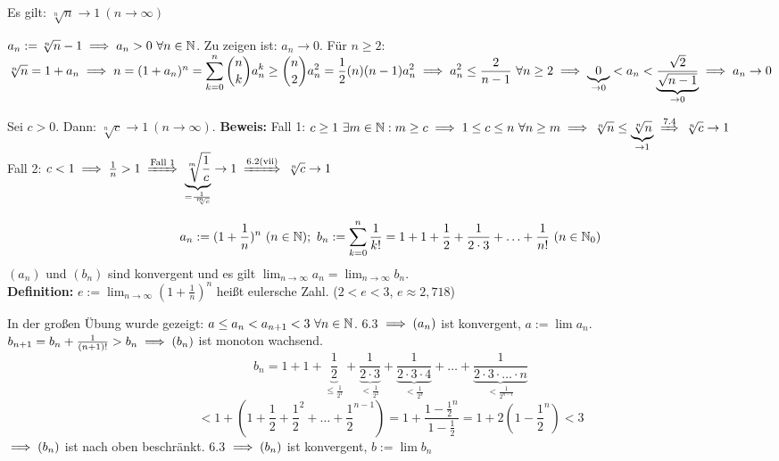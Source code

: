 \documentclass{article}
\begin{document}
\begin{satz}
Es gilt: $\sqrt[n]{n} \to 1 \ (n \to \infty)$
\end{satz}

\begin{beweis}
$a_n := \sqrt[n]{n} -1 \folgt a_n > 0 \ \forall n \in\MdN$. Zu zeigen ist: $a_n \to 0$. Für $n \ge 2$: $\sqrt[n]{n} = 1 + a_n \implies n = (1+a_n)^n = \displaystyle\sum_{k=0}^n \binom{n}{k}a_n^k \ge \binom{n}{2}a_n^2 = \frac{1}{2}(n)(n-1)a_n^2 \implies a_n^2 \le \frac{2}{n-1} \ \forall n\ge 2 \implies \underbrace{0}_{\to 0} < a_n < \underbrace{\frac{\sqrt{2}}{\sqrt{n-1}}}_{\to 0} \implies a_n \to 0$
\end{beweis}

\begin{wichtigesbeispiel}
Sei $c>0$. Dann: $\sqrt[n]{c} \to 1 \ (n\to\infty)$.
\textbf{Beweis:} Fall 1: $c\ge 1 \ \exists m \in\MdN: m \ge c \folgt 1\le c\le n \ \forall n\ge m \folgt \sqrt[n]{n} \le \underbrace{\sqrt[n]{n}}_{\to 1} \folgtnach{7.4} \sqrt[n]{c} \to 1$ \\
Fall 2: $c<1 \folgt \frac{1}{n} > 1 \folgtnach{Fall 1} \underbrace{\sqrt[m]{\frac{1}{c}}}_{=\frac{1}{\sqrt[m]{c}}} \to 1 \folgtnach{6.2(vii)} \sqrt[n]{c} \to 1$
\end{wichtigesbeispiel}

\begin{satz}
$$a_n := (1+\frac{1}{n})^n \ (n\in\MdN);\ b_n := \displaystyle\sum_{k=0}^n \frac{1}{k!} = 1 + 1 + \frac{1}{2} + \frac{1}{2\cdot3}+ \ldots + \frac{1}{n!}\ (n\in\MdN_0)$$
$(a_n)$ und $(b_n)$ sind konvergent und es gilt $\displaystyle\lim_{n\to\infty} a_n = \displaystyle\lim_{n\to\infty} b_n$.\\
\textbf{Definition:} $e := \displaystyle\lim_{n\to\infty} (1+\frac{1}{n})^n$ heißt eulersche Zahl. ($2<e<3$, $e\approx 2,718$)
\end{satz}

In der großen Übung wurde gezeigt: $a\le a_n < a_{n+1} < 3\ \forall n\in\mathbb{N}$. 6.3 $\implies(a_n)$ ist konvergent, $a:=\lim a_n$.\\
$b_{n+1} = b_n + \frac{1}{(n+1)!} > b_n \implies (b_n)$ ist monoton wachsend.
$$b_n = 1+ 1+ \underbrace{\frac{1}{2}}_{\le\frac{1}{2^1}} + \underbrace{\frac{1}{2\cdot3}}_{<\frac{1}{2^2}} + \underbrace {\frac{1}{2\cdot 3\cdot 4}}_{< \frac{1}{2^3}}+\ldots+ \underbrace{\frac{1}{2\cdot3\cdot\ldots\cdot n}}_{< \frac{1}{2^{n-1}}} $$
$$ < 1+ (1+ \frac{1}{2} + \frac{1}{2}^2 + \ldots + \frac{1}{2}^{n-1}) = 1+ \frac{1-\frac{1}{2}^n}{1-\frac{1}{2}} = 1+ 2(1-\frac{1}{2}^n) < 3$$
$\implies (b_n)$ ist nach oben beschränkt. 6.3 $\implies (b_n)$ ist konvergent, $b:=\lim b_n$
\end{document}
